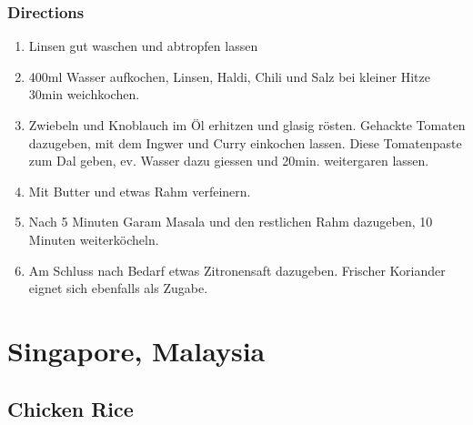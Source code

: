 \subsubsection*{Directions}
\begin{enumerate}
\item Linsen gut waschen und abtropfen lassen
\item 400ml Wasser aufkochen, Linsen, Haldi, Chili und Salz bei kleiner Hitze 30min weichkochen. 
\item Zwiebeln und Knoblauch im Öl erhitzen und glasig rösten. Gehackte Tomaten dazugeben, mit dem Ingwer und Curry einkochen lassen. Diese Tomatenpaste zum Dal geben, ev. Wasser dazu giessen und 20min. weitergaren lassen. 
\item Mit Butter und etwas Rahm verfeinern. 
\item Nach 5 Minuten Garam Masala und den restlichen Rahm dazugeben, 10 Minuten weiterköcheln. 
\item Am Schluss nach Bedarf etwas Zitronensaft dazugeben. Frischer Koriander eignet sich ebenfalls als Zugabe.
\end{enumerate}
\pagebreak

\section{Singapore, Malaysia}
\subsection{Chicken Rice}
